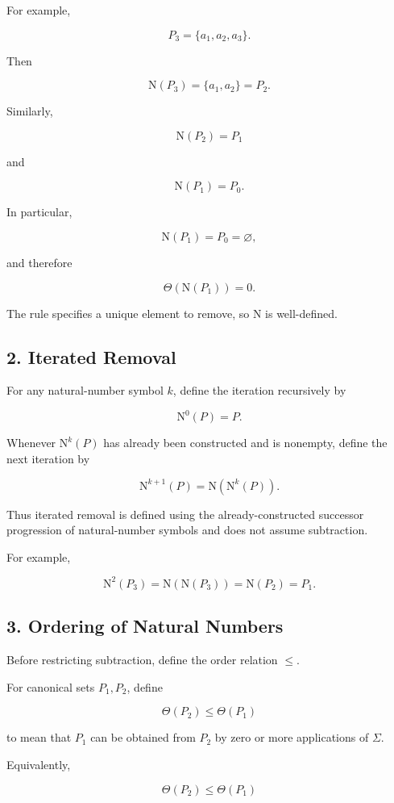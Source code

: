 \documentclass[12pt]{article}
\newcommand{\Nu}{\mathrm{N}}
\begin{document}
For example,

\[
P_3=\{a_1,a_2,a_3\}.
\]

Then

\[
\Nu(P_3)
=
\{a_1,a_2\}
=
P_2.
\]

Similarly,

\[
\Nu(P_2)=P_1
\]

and

\[
\Nu(P_1)=P_0.
\]

In particular,

\[
\Nu(P_1)=P_0=\varnothing,
\]

and therefore

\[
\Theta(\Nu(P_1))=0.
\]

The rule specifies a unique element to remove, so \(\Nu\) is well-defined.

\subsection*{2. Iterated Removal}

For any natural-number symbol \(k\), define the iteration recursively by

\[
\boxed{
\Nu^0(P)=P.
}
\]

Whenever \(\Nu^k(P)\) has already been constructed and is nonempty, define the next iteration by

\[
\boxed{
\Nu^{k+1}(P)
=
\Nu\left(\Nu^k(P)\right).
}
\]

Thus iterated removal is defined using the already-constructed successor progression of natural-number symbols and does not assume subtraction.

For example,

\[
\Nu^2(P_3)
=
\Nu(\Nu(P_3))
=
\Nu(P_2)
=
P_1.
\]

\subsection*{3. Ordering of Natural Numbers}

Before restricting subtraction, define the order relation \(\leq\).

For canonical sets \(P_1,P_2\), define

\[
\boxed{
\Theta(P_2)\leq \Theta(P_1)
}
\]

to mean that \(P_1\) can be obtained from \(P_2\) by zero or more applications of \(\Sigma\).

Equivalently,

\[
\Theta(P_2)\leq \Theta(P_1)
\]
\end{document}
